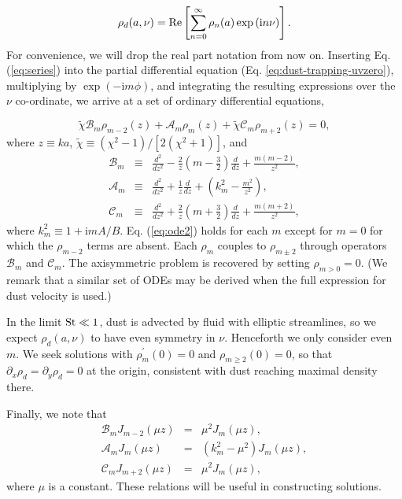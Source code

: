 \documentclass[apj]{emulateapj}
\newcommand{\Eq}[1]{Eq. (\ref{#1})}
\newcommand{\eq}[1]{\Eq{#1}}
\newcommand{\eqp}[1]{(Eq. \ref{#1})}
\newcommand{\beq}{\begin{equation}}
\newcommand{\eeq}{\end{equation}}
\newcommand{\beqn}{\begin{eqnarray}}
\newcommand{\eeqn}{\end{eqnarray}}
\newcommand{\St}{{\rm St}}
\begin{document}
\beq\label{eq:series}
\rho_d(a,\nu) = {\rm Re}
\left[\sum_{n=0}^\infty\rho_n(a)\exp{\left(\mathrm{i}n\nu\right)} \right].
\eeq
For convenience, we will drop the real part notation from now on. Inserting
\eq{eq:series} into the partial differential equation \eqp{eq:dust-trapping-uvzero},
multiplying by $\exp{(-\mathrm{i}m\phi)}$, and integrating the resulting
expressions over the $\nu$ co-ordinate, we arrive at a set of 
ordinary differential equations, 

\beq\label{eq:ode2}
\tilde{\chi}\mathcal{B}_m\rho_{m-2}(z) + \mathcal{A}_m\rho_m(z) + \tilde{\chi}\mathcal{C}_m\rho_{m+2}(z)=0,
\eeq
where $z\equiv ka$, $\tilde{\chi}\equiv(\chi^2-1)/[2(\chi^2+1)]$, and 
\beqn\label{eq:ops}
\mathcal{B}_m &\equiv& \frac{d^2}{dz^2} -
\frac{2}{z}\left(m-\frac{3}{2}\right)\frac{d}{dz} + \frac{m(m-2)}{z^2},\\
\mathcal{A}_m &\equiv& \frac{d^2}{dz^2} + \frac{1}{z}\frac{d}{dz} +
\left(k_m^2 - \frac{m^2}{z^2}\right),\\
\mathcal{C}_m  &\equiv& \frac{d^2}{dz^2} +
\frac{2}{z}\left(m+\frac{3}{2}\right)\frac{d}{dz} +
\frac{m(m+2)}{z^2},\label{eq:opsw} 
\eeqn
where $k_m^2 \equiv 1+\mathrm{i}mA/B$. \eq{eq:ode2} holds for each
$m$ except for $m=0$ for which the $\rho_{m-2}$ terms are absent. Each
$\rho_m$ couples to $\rho_{m\pm2}$ through operators $\mathcal{B}_m$
and $\mathcal{C}_m$. The axisymmetric problem is recovered by
setting $\rho_{m>0}=0$. (We remark that a similar set of ODEs may be
derived when the full expression for dust velocity is used.)  

In the limit $\St\ll 1$, dust is advected by fluid with elliptic
streamlines, so we expect $\rho_d(a,\nu)$ to have even symmetry in
$\nu$. Henceforth we only consider even $m$. We seek solutions with  
$\rho_m^\prime(0)=0$ and $\rho_{m\geq2}(0)=0$, so that
$\partial_x\rho_d=\partial_y\rho_d=0$ at the origin, consistent with 
dust reaching maximal density there.  

Finally, we note that
\beqn\label{eq:ops2}
\mathcal{B}_mJ_{m-2}(\mu z) &=& \mu^2J_m(\mu z),\\
\mathcal{A}_mJ_m(\mu z) &=& \left(k_m^2 - \mu^2\right)J_m(\mu z),\\
\mathcal{C}_mJ_{m+2}(\mu z) &= & \mu^2J_m(\mu z),
\eeqn
where $\mu$ is a constant. These relations will be useful in
constructing solutions. 
\end{document}
